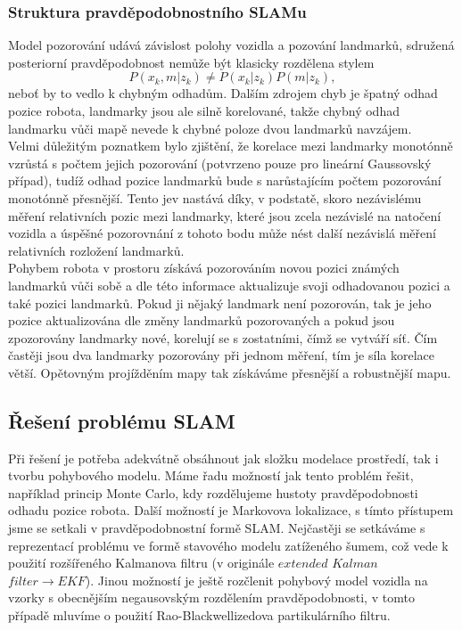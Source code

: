 \documentclass[11pt]{article}
\begin{document}
\subsubsection{Struktura pravděpodobnostního SLAMu}
Model pozorování udává závislost polohy vozidla a pozování landmarků, sdružená posteriorní pravděpodobnost nemůže být klasicky rozdělena stylem 
$$P(x_k,m|z_k)\neq P(x_k|z_k)P(m|z_k),$$
neboť by to vedlo k chybným odhadům. Dalším zdrojem chyb je špatný odhad pozice robota, landmarky jsou ale silně korelované, takže chybný odhad landmarku vůči mapě nevede k chybné poloze dvou landmarků navzájem.\\
\indent Velmi důležitým poznatkem bylo zjištění, že korelace mezi landmarky monotónně vzrůstá s počtem jejich pozorování (potvrzeno pouze pro lineární Gaussovský případ), tudíž odhad pozice landmarků bude s narůstajícím počtem pozorování monotónně přesnější. Tento jev nastává díky, v podstatě, skoro nezávislému měření relativních pozic mezi landmarky, které jsou zcela nezávislé na natočení vozidla a úspěšné pozorovnání z tohoto bodu může nést další nezávislá měření relativních rozložení landmarků. \\
\indent Pohybem robota v prostoru získává pozorováním novou pozici známých landmarků vůči sobě a dle této informace aktualizuje svoji odhadovanou pozici a také pozici landmarků. Pokud ji nějaký landmark není pozorován, tak je jeho pozice aktualizována dle změny landmarků pozorovaných a pokud jsou zpozorovány landmarky nové, korelují se s zostatními, čímž se vytváří síť. Čím častěji jsou dva landmarky pozorovány při jednom měření, tím je síla korelace větší. Opětovným projížděním mapy tak získáváme přesnější a robustnější mapu.\\


\subsection{Řešení problému SLAM}
Při řešení je potřeba adekvátně obsáhnout jak složku modelace prostředí, tak i tvorbu pohybového modelu.
Máme řadu možností jak tento problém řešit, například princip Monte Carlo, kdy rozdělujeme hustoty pravděpodobnosti odhadu pozice robota. Další možností je Markovova lokalizace, s tímto přístupem jsme se setkali v pravděpodobnostní formě SLAM. Nejčastěji se setkáváme s reprezentací problému ve formě stavového modelu zatíženého šumem, což vede k použití rozšířeného Kalmanova filtru (v originále $extended$ $Kalman$ $filter\rightarrow EKF$). Jinou možností je ještě rozčlenit pohybový model vozidla na vzorky s obecnějším negausovským rozdělením pravděpodobnosti, v tomto případě mluvíme o použití Rao-Blackwellizedova partikulárního filtru. 
\end{document}

